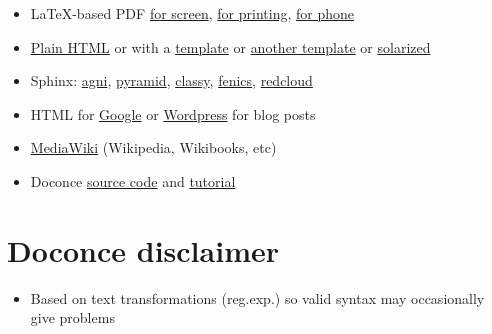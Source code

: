 \documentclass[%
twoside,                 %
final,                   %
chapterprefix=true,      %
open=right               %
10pt]{book}
\newcounter{doconce:movie:counter}
\newcounter{doconce:exercise:counter}
\begin{document}
\begin{itemize}
 \item LaTeX-based PDF \href{{http://hplgit.github.com/teamods/writing_reports/_static/report.pdf}}{for screen}, \href{{http://hplgit.github.com/teamods/writing_reports/_static/report_4printing.pdf}}{for printing}, \href{{http://hplgit.github.com/teamods/writing_reports/_static/report_4phone.pdf}}{for phone}

 \item \href{{http://hplgit.github.com/teamods/writing_reports/_static/report_do.html}}{Plain HTML} or with a \href{{http://hplgit.github.com/teamods/writing_reports/_static/report_vagrant.html}}{template} or \href{{http://hplgit.github.com/teamods/writing_reports/_static/report_github_minimal.html}}{another template} or \href{{http://hplgit.github.com/teamods/writing_reports/_static/report_solarized.html}}{solarized}

 \item Sphinx: \href{{http://hplgit.github.com/teamods/writing_reports/_static/sphinx-agni/index.html}}{agni}, \href{{http://hplgit.github.com/teamods/writing_reports/_static/sphinx-pyramid/report.html}}{pyramid}, \href{{http://hplgit.github.com/teamods/writing_reports/_static/sphinx-classy/report.html}}{classy}, \href{{http://hplgit.github.com/teamods/writing_reports/_static/sphinx-fenics_minimal/report.html}}{fenics}, \href{{http://hplgit.github.com/teamods/writing_reports/_static/sphinx-redcloud/report.html}}{redcloud}

 \item HTML for \href{{http://doconce-report-demo.blogspot.no/}}{Google} or \href{{http://doconcereportdemo.wordpress.com/}}{Wordpress} for blog posts

 \item \href{{http://doconcedemo.shoutwiki.com/wiki/Doconce_demo_page}}{MediaWiki} (Wikipedia, Wikibooks, etc)

 \item Doconce \href{{http://hplgit.github.com/teamods/writing_reports/_static/report.do.txt.html}}{source code} and \href{{http://hplgit.github.io/doconce/doc/pub/tutorial/html/index.html}}{tutorial}
\end{itemize}

\noindent
\section*{Doconce disclaimer}

\begin{itemize}
 \item Based on text transformations (reg.exp.) so valid syntax may
   occasionally give problems
\end{itemize}
\end{document}
